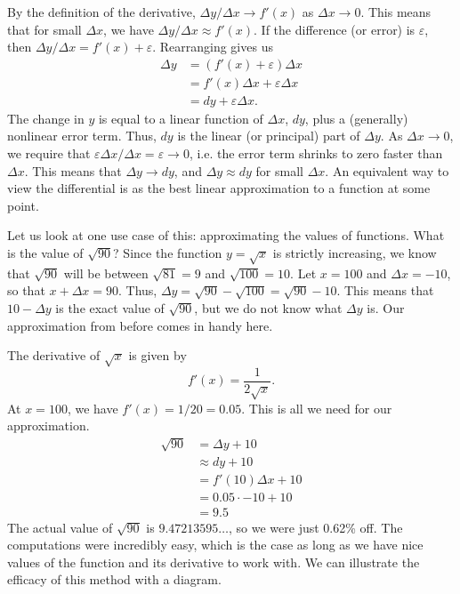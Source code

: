 \documentclass[a4paper,12pt]{article}
\begin{document}
By the definition of the derivative, $\Delta y / \Delta x \to f'(x)$ as $\Delta x \to 0$.
This means that for small $\Delta x$, we have $\Delta y / \Delta x \approx f'(x)$.
If the difference (or error) is $\varepsilon$, then $\Delta y / \Delta x = f'(x) + \varepsilon$.
Rearranging gives us
\begin{align*}
    \Delta y &= (f'(x) + \varepsilon) \Delta x \\
    &= f'(x) \Delta x + \varepsilon \Delta x \\
    &= dy + \varepsilon \Delta x.
\end{align*}
The change in $y$ is equal to a linear function of $\Delta x$, $dy$, plus a (generally) nonlinear error term.
Thus, $dy$ is the linear (or principal) part of $\Delta y$.
As $\Delta x \to 0$, we require that $\varepsilon \Delta x / \Delta x = \varepsilon \to 0$, i.e. the error term shrinks to zero faster than $\Delta x$.
This means that $\Delta y \to d y$, and $\Delta y \approx dy$ for small $\Delta x$.
An equivalent way to view the differential is as the best linear approximation to a function at some point.

Let us look at one use case of this: approximating the values of functions.
What is the value of $\sqrt{90}$?
Since the function $y = \sqrt{x}$ is strictly increasing, we know that $\sqrt{90}$ will be between $\sqrt{81}=9$ and $\sqrt{100}=10$.
Let $x = 100$ and $\Delta x = -10$, so that $x + \Delta x = 90$.
Thus, $\Delta y = \sqrt{90} - \sqrt{100} = \sqrt{90} - 10$.
This means that $10 - \Delta y$ is the exact value of $\sqrt{90}$, but we do not know what $\Delta y$ is.
Our approximation from before comes in handy here.

The derivative of $\sqrt{x}$ is given by
\begin{equation*}
    f'(x) = \frac{1}{2\sqrt{x}}.
\end{equation*}
At $x=100$, we have $f'(x) = 1/20 = 0.05$.
This is all we need for our approximation.
\begin{align*}
    \sqrt{90} &= \Delta y + 10 \\
    &\approx dy + 10 \\
    &= f'(10) \Delta x + 10 \\
    &= 0.05 \cdot -10 + 10 \\
    &= 9.5
\end{align*}
The actual value of $\sqrt{90}$ is $9.47213595\ldots$, so we were just 0.62\% off.
The computations were incredibly easy, which is the case as long as we have nice values of the function and its derivative to work with.
We can illustrate the efficacy of this method with a diagram.
\end{document}
